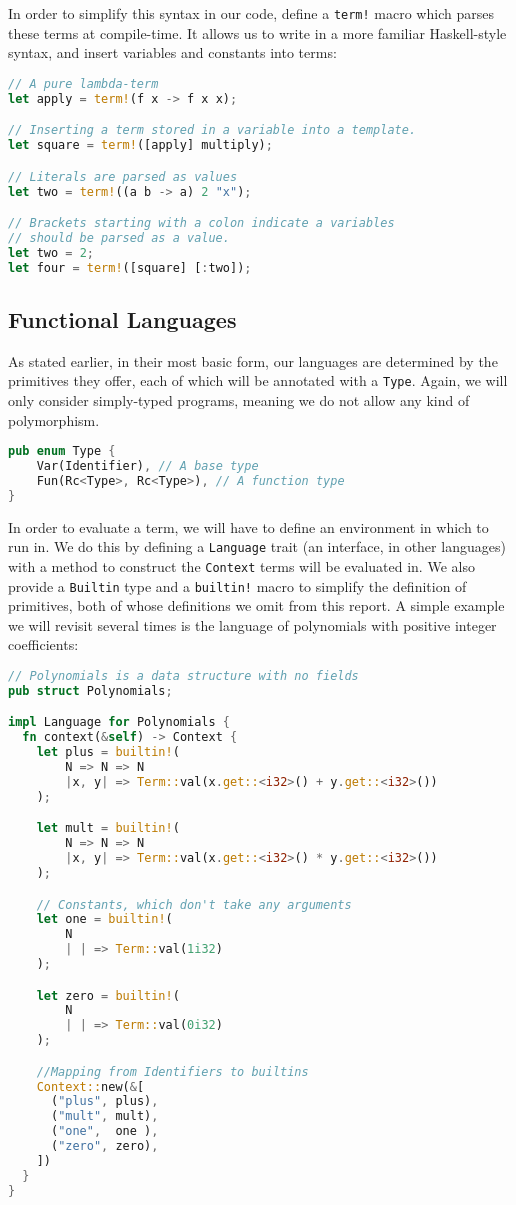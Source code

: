 In order to simplify this syntax in our code, define a \texttt{term!} macro which parses these terms at compile-time. It allows us to write in a more familiar Haskell-style syntax, and insert variables and constants into terms:

\begin{lstlisting}[language=rust]
// A pure lambda-term
let apply = term!(f x -> f x x);

// Inserting a term stored in a variable into a template.
let square = term!([apply] multiply); 

// Literals are parsed as values  
let two = term!((a b -> a) 2 "x");

// Brackets starting with a colon indicate a variables
// should be parsed as a value.
let two = 2;
let four = term!([square] [:two]);
\end{lstlisting}
\subsection{Functional Languages}

As stated earlier, in their most basic form, our languages are determined by the primitives they offer, each of which will be annotated with a \texttt{Type}. Again, we will only consider simply-typed programs, meaning we do not allow any kind of polymorphism.

\begin{lstlisting}[language=rust]
pub enum Type {
    Var(Identifier), // A base type
    Fun(Rc<Type>, Rc<Type>), // A function type
}
\end{lstlisting}
In order to evaluate a term, we will have to define an environment in which to run in. We do this by defining a \texttt{Language} trait (an interface, in other languages) with a method to construct the \texttt{Context} terms will be evaluated in. We also provide a \texttt{Builtin} type and a \texttt{builtin!} macro to simplify the definition of primitives, both of whose definitions we omit from this report. A simple example we will revisit several times is the language of polynomials with positive integer coefficients:

\begin{lstlisting}[language=rust]
// Polynomials is a data structure with no fields
pub struct Polynomials;

impl Language for Polynomials {
  fn context(&self) -> Context {
    let plus = builtin!(
        N => N => N 
        |x, y| => Term::val(x.get::<i32>() + y.get::<i32>())
    );

    let mult = builtin!(
        N => N => N
        |x, y| => Term::val(x.get::<i32>() * y.get::<i32>())
    );

    // Constants, which don't take any arguments
    let one = builtin!(
        N
        | | => Term::val(1i32)
    );

    let zero = builtin!(
        N
        | | => Term::val(0i32)
    );

    //Mapping from Identifiers to builtins
    Context::new(&[
      ("plus", plus),
      ("mult", mult),
      ("one",  one ),
      ("zero", zero),
    ])
  }
}
\end{lstlisting}

